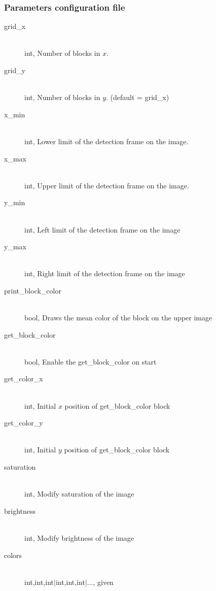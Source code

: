    \subsubsection{Parameters configuration file}
    \label{sec:md:howto:params}
        \begin{description}
            \item[grid\_x] \hfill \\ int, Number of blocks in $x$.
            \item[grid\_y] \hfill \\ int,  Number of blocks in $y$. 
                (default = grid\_x)
            \item[x\_min] \hfill \\ int, Lower limit of the detection 
                frame on the image.
            \item[x\_max] \hfill \\ int, Upper limit of the detection 
                frame on the image.
            \item[y\_min] \hfill \\ int, Left limit of the detection frame 
                on the image
            \item[y\_max] \hfill \\ int, Right limit of the detection 
                frame on the image
            \item[print\_block\_color] \hfill \\ bool, Draws the mean 
                color of the block on the upper image
            \item[get\_block\_color] \hfill \\ bool, Enable the 
                get\_block\_color on start
            \item[get\_color\_x] \hfill \\ int,  Initial $x$ position of 
                get\_block\_color block
            \item[get\_color\_y] \hfill \\ int,  Initial $y$ position of 
                get\_block\_color block
            \item[saturation] \hfill \\ int,  Modify saturation of the 
                image
            \item[brightness] \hfill \\ int,  Modify brightness of the 
                image
            \item[colors] \hfill \\ int,int,int$|$int,int,int$|$..., given 

\end{description}

